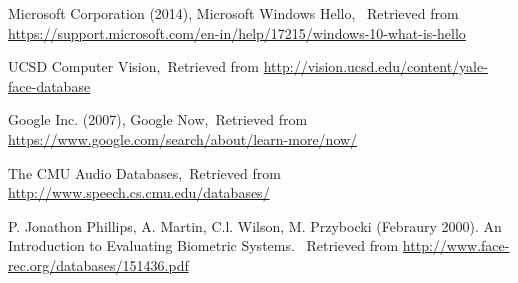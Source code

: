 \cleardoublepage
{}
{}
\begin{thebibliography}{99}

 Microsoft Corporation (2014), Microsoft Windows Hello, \ Retrieved from  \url{https://support.microsoft.com/en-in/help/17215/windows-10-what-is-hello}

UCSD Computer Vision,\ Retrieved from  \url{http://vision.ucsd.edu/content/yale-face-database}

 Google Inc. (2007), Google Now,\ Retrieved from  \url{https://www.google.com/search/about/learn-more/now/}

The CMU Audio Databases,\ Retrieved from  \url{http://www.speech.cs.cmu.edu/databases/}

 P. Jonathon Phillips, A. Martin, C.l. Wilson, M. Przybocki (Febraury 2000).  An Introduction to Evaluating Biometric Systems. \ Retrieved from \url{http://www.face-rec.org/databases/151436.pdf}

\end{thebibliography}
